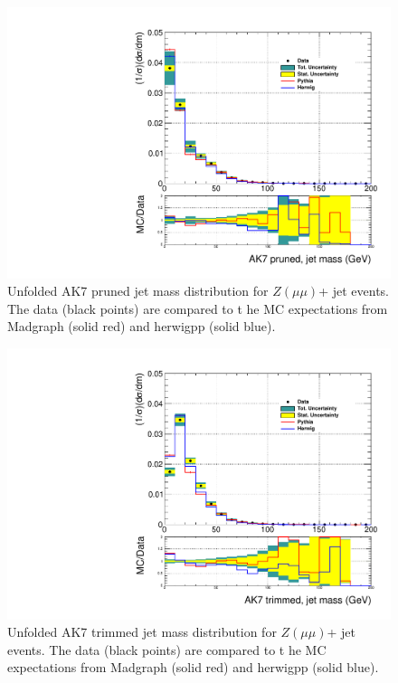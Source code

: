 \begin{figure}[!htb]
\centering\includegraphics[width=1.\textwidth]{figs/Zmm/jetmassunf_ak7pr_allpT.pdf}
\caption{Unfolded AK7 pruned jet mass distribution for $Z(\mu\mu)$+ jet events. The data (black points) are compared to t
he MC expectations from Madgraph (solid red) and herwigpp (solid blue).}
\label{figs:AK7ZmmInt2}
\end{figure}

\begin{figure}[!htb]
\centering\includegraphics[width=1.\textwidth]{figs/Zmm/jetmassunf_ak7tr_allpT.pdf}
\caption{Unfolded AK7 trimmed jet mass distribution for $Z(\mu\mu)$+ jet events. The data (black points) are compared to t
he MC expectations from Madgraph (solid red) and herwigpp (solid blue).}
\label{figs:AK7ZmmInt3}
\end{figure}



